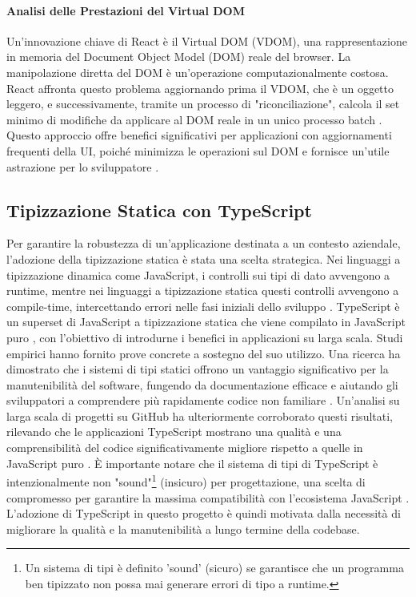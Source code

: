 \documentclass[12pt,a4paper,openright,twoside]{book}
\begin{document}
\paragraph{Analisi delle Prestazioni del Virtual DOM}
Un'innovazione chiave di React è il Virtual DOM (VDOM), una rappresentazione in memoria del Document Object Model (DOM) reale del browser. La manipolazione diretta del DOM è un'operazione computazionalmente costosa. React affronta questo problema aggiornando prima il VDOM, che è un oggetto leggero, e successivamente, tramite un processo di "riconciliazione", calcola il set minimo di modifiche da applicare al DOM reale in un unico processo batch \cite{chen2019performance}. Questo approccio offre benefici significativi per applicazioni con aggiornamenti frequenti della UI, poiché minimizza le operazioni sul DOM e fornisce un'utile astrazione per lo sviluppatore \cite{chen2019performance}.

\subsection{Tipizzazione Statica con TypeScript}
Per garantire la robustezza di un'applicazione destinata a un contesto aziendale, l'adozione della tipizzazione statica è stata una scelta strategica.
Nei linguaggi a tipizzazione dinamica come JavaScript, i controlli sui tipi di dato avvengono a runtime, mentre nei linguaggi a tipizzazione statica questi controlli avvengono a compile-time, intercettando errori nelle fasi iniziali dello sviluppo \cite{mayerTyping}. TypeScript è un superset di JavaScript a tipizzazione statica che viene compilato in JavaScript puro \cite{bierman2014understanding}, con l'obiettivo di introdurne i benefici in applicazioni su larga scala. Studi empirici hanno fornito prove concrete a sostegno del suo utilizzo. Una ricerca ha dimostrato che i sistemi di tipi statici offrono un vantaggio significativo per la manutenibilità del software, fungendo da documentazione efficace e aiutando gli sviluppatori a comprendere più rapidamente codice non familiare \cite{hanenberg2014empirical}. Un'analisi su larga scala di progetti su GitHub ha ulteriormente corroborato questi risultati, rilevando che le applicazioni TypeScript mostrano una qualità e una comprensibilità del codice significativamente migliore rispetto a quelle in JavaScript puro \cite{Bogner_2022}. È importante notare che il sistema di tipi di TypeScript è intenzionalmente non "sound"\footnote{Un sistema di tipi è definito 'sound' (sicuro) se garantisce che un programma ben tipizzato non possa mai generare errori di tipo a runtime.} (insicuro) per progettazione, una scelta di compromesso per garantire la massima compatibilità con l'ecosistema JavaScript \cite{bierman2014understanding}. L'adozione di TypeScript in questo progetto è quindi motivata dalla necessità di migliorare la qualità e la manutenibilità a lungo termine della codebase.
\end{document}

